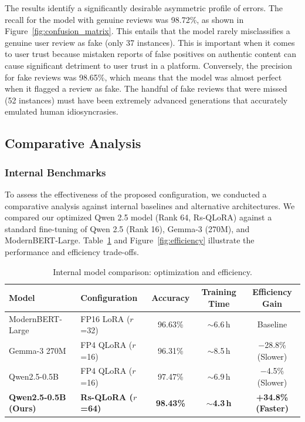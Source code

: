 \documentclass[utf8]{FrontiersinHarvard}
\begin{document}
The results identify a significantly desirable asymmetric profile of errors. The recall for the model with genuine reviews was 98.72\%, as shown in Figure~\ref{fig:confusion_matrix}. This entails that the model rarely misclassifies a genuine user review as fake (only 37 instances). This is important when it comes to user trust because mistaken reports of false positives on authentic content can cause significant detriment to user trust in a platform. Conversely, the precision for fake reviews was 98.65\%, which means that the model was almost perfect when it flagged a review as fake. The handful of fake reviews that were missed (52 instances) must have been extremely advanced generations that accurately emulated human idiosyncrasies.

\subsection{Comparative Analysis}

\subsubsection{Internal Benchmarks}

To assess the effectiveness of the proposed configuration, we conducted a comparative analysis against internal baselines and alternative architectures. We compared our optimized Qwen 2.5 model (Rank 64, Rs-QLoRA) against a standard fine-tuning of Qwen 2.5 (Rank 16), Gemma-3 (270M), and ModernBERT-Large. Table~\ref{tab:internal} and Figure~\ref{fig:efficiency} illustrate the performance and efficiency trade-offs.

\begin{table}[htbp]
\caption{Internal model comparison: optimization and efficiency.}\label{tab:internal}
\centering
\begin{tabular}{llccc}
\toprule
\textbf{Model} & \textbf{Configuration} & \textbf{Accuracy} & \textbf{Training Time} & \textbf{Efficiency Gain} \\
\midrule
ModernBERT-Large     & FP16 LoRA ($r$=32) & 96.63\% & $\sim$6.6\,h & Baseline \\
Gemma-3 270M         & FP4 QLoRA ($r$=16) & 96.31\% & $\sim$8.5\,h & $-$28.8\% (Slower) \\
Qwen2.5-0.5B         & FP4 QLoRA ($r$=16) & 97.47\% & $\sim$6.9\,h & $-$4.5\% (Slower) \\
\textbf{Qwen2.5-0.5B (Ours)} & \textbf{Rs-QLoRA ($r$=64)} & \textbf{98.43\%} & $\sim$\textbf{4.3\,h} & \textbf{+34.8\% (Faster)} \\
\bottomrule
\end{tabular}
\end{table}
\end{document}
